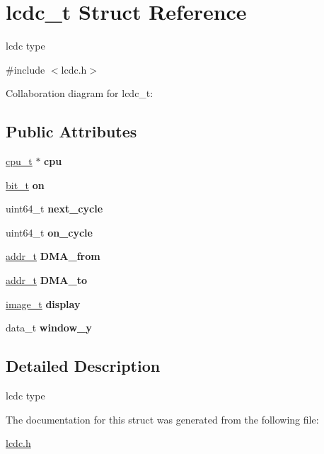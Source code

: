 \hypertarget{structlcdc__t}{}\section{lcdc\+\_\+t Struct Reference}
\label{structlcdc__t}


lcdc type  




{\ttfamily \#include $<$lcdc.\+h$>$}



Collaboration diagram for lcdc\+\_\+t\+:
\subsection*{Public Attributes}
\begin{DoxyCompactItemize}
\item 
\mbox{\label{structlcdc__t_a4dd1cf96849d92a15974556fabbd40bf}} 
\hyperlink{structcpu__t}{cpu\+\_\+t} $\ast$ {\bfseries cpu}
\item 
\mbox{\label{structlcdc__t_aa9a4daa50f5b37885e2c3c790534bfc7}} 
\hyperlink{bit_8h_ab6e831ce3850688e9d0c2bb9ec57fb45}{bit\+\_\+t} {\bfseries on}
\item 
\mbox{\label{structlcdc__t_acce062775dfe7e45d7de0a0f2348143c}} 
uint64\+\_\+t {\bfseries next\+\_\+cycle}
\item 
\mbox{\label{structlcdc__t_a2af7dd6a580a8c333a1668d6082c40dd}} 
uint64\+\_\+t {\bfseries on\+\_\+cycle}
\item 
\mbox{\label{structlcdc__t_a20d959f1e601d01ae9f24e0f2066fcfc}} 
\hyperlink{memory_8h_a8a6444037e4d5cc2bf8ba22a9d9e33ca}{addr\+\_\+t} {\bfseries D\+M\+A\+\_\+from}
\item 
\mbox{\label{structlcdc__t_a69100c32ae16b4d1c76ea84cfc244c33}} 
\hyperlink{memory_8h_a8a6444037e4d5cc2bf8ba22a9d9e33ca}{addr\+\_\+t} {\bfseries D\+M\+A\+\_\+to}
\item 
\mbox{\label{structlcdc__t_a41fb9980f93ecb1e8cb660a1090f0d78}} 
\hyperlink{structimage__}{image\+\_\+t} {\bfseries display}
\item 
\mbox{\label{structlcdc__t_a6c064c9169212e335e6213c2cf8405f4}} 
data\+\_\+t {\bfseries window\+\_\+y}
\end{DoxyCompactItemize}


\subsection{Detailed Description}
lcdc type 

The documentation for this struct was generated from the following file\+:\begin{DoxyCompactItemize}
\item 
\hyperlink{lcdc_8h}{lcdc.\+h}\end{DoxyCompactItemize}
